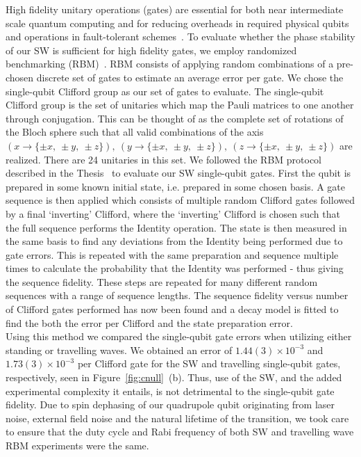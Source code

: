 \documentclass[12pt]{iopart}
\begin{document}
    High fidelity unitary operations (gates) are essential for both
    near intermediate scale quantum computing and for reducing
    overheads in required physical qubits and operations in
    fault-tolerant schemes~\cite{steane_overhead_2003}. To evaluate whether the phase
    stability of our SW is sufficient for high fidelity gates, we
    employ randomized benchmarking (RBM)~\cite{knill_randomized_2008, magesan_scalable_2011}.  RBM consists of
    applying random combinations of a pre-chosen discrete set of gates
    to estimate an average error per gate.  We chose the single-qubit
    Clifford group as our set of gates to evaluate. The single-qubit
    Clifford group is the set of unitaries which map the Pauli
    matrices to one another through conjugation. This can be thought
    of as the complete set of rotations of the Bloch sphere such that
    all valid combinations of the axis
    $(x \rightarrow \{\pm x,~\pm y,~\pm z\}),~(y \rightarrow \{\pm x,~\pm y,~\pm z\}),~(z \rightarrow \{\pm x,~\pm y,~\pm z\})$
    are realized. There are 24 unitaries in this set. We followed the
    RBM protocol described in the Thesis~\cite{hughes_benchmarking_2021} to evaluate our SW
    single-qubit gates. First the qubit is prepared in some known
    initial state, i.e. prepared in some chosen basis. A gate sequence
    is then applied which consists of multiple random Clifford gates
    followed by a final `inverting' Clifford, where the `inverting'
    Clifford is chosen such that the full
    sequence performs the Identity operation. The state is then
    measured in the same basis to find any deviations from the
    Identity being performed due to gate errors. This is repeated with
    the same preparation and sequence multiple times to calculate the
    probability that the Identity was performed - thus giving the
    sequence fidelity. These steps are repeated for many different
    random sequences with a range of sequence lengths. The sequence
    fidelity versus number of Clifford gates performed has now been
    found and a decay model is fitted to find the both the error per
    Clifford and the state preparation error.\\ Using this method we
    compared the single-qubit gate errors when utilizing either
    standing or travelling waves. We obtained an error of $1.44(3)
    \times 10^{-3}$ and $1.73(3) \times 10^{-3}$ per Clifford gate for
    the SW and travelling single-qubit gates, respectively, seen in
    Figure~\ref{fig:cnull}~(b). Thus, use of the SW, and the added
    experimental complexity it entails, is not detrimental to
    the single-qubit gate fidelity. Due to spin dephasing of our
    quadrupole qubit originating from laser noise, external field
    noise and the natural lifetime of the transition, we took care to
    ensure that the duty cycle and Rabi frequency of both SW and
    travelling wave RBM experiments were the same. \\
\end{document}
